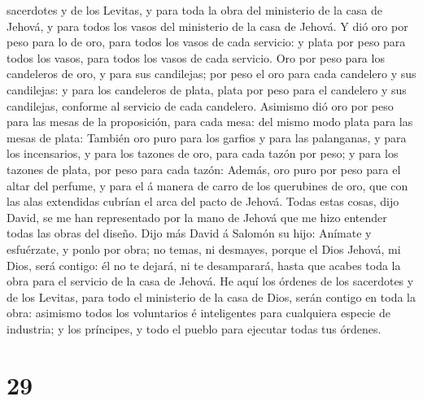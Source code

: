sacerdotes y de los Levitas, y para toda la obra del ministerio de la
casa de Jehová, y para todos los vasos del ministerio de la casa de
Jehová.  Y dió oro por peso para lo de oro, para todos
los vasos de cada servicio: y plata por peso para todos los vasos, para
todos los vasos de cada servicio.  Oro por peso para los
candeleros de oro, y para sus candilejas; por peso el oro para cada
candelero y sus candilejas: y para los candeleros de plata, plata por
peso para el candelero y sus candilejas, conforme al servicio de cada
candelero.  Asimismo dió oro por peso para las mesas de
la proposición, para cada mesa: del mismo modo plata para las mesas de
plata:  También oro puro para los garfios y para las
palanganas, y para los incensarios, y para los tazones de oro, para cada
tazón por peso; y para los tazones de plata, por peso para cada tazón:
 Además, oro puro por peso para el altar del perfume, y
para el á manera de carro de los querubines de oro, que con las alas
extendidas cubrían el arca del pacto de Jehová.  Todas
estas cosas, dijo David, se me han representado por la mano de Jehová
que me hizo entender todas las obras del diseño.  Dijo
más David á Salomón su hijo: Anímate y esfuérzate, y ponlo por obra; no
temas, ni desmayes, porque el Dios Jehová, mi Dios, será contigo: él no
te dejará, ni te desamparará, hasta que acabes toda la obra para el
servicio de la casa de Jehová.  He aquí los órdenes de
los sacerdotes y de los Levitas, para todo el ministerio de la casa de
Dios, serán contigo en toda la obra: asimismo todos los voluntarios é
inteligentes para cualquiera especie de industria; y los príncipes, y
todo el pueblo para ejecutar todas tus órdenes.

\hypertarget{section-28}{%
\section{29}\label{section-28}}

